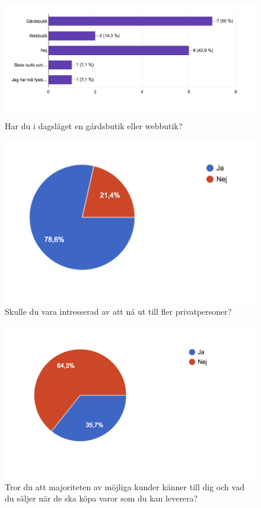 \documentclass[10pt,a4paper,oneside]{article}
\begin{document}
\begin{figure}
	\includegraphics[scale=0.6]{5.png}
	\caption{Har du i dagsl\"aget en g\'ardsbutik eller webbutik?}
\end{figure}

\begin{figure}
	\includegraphics[scale=0.6]{6.png}
	\caption{Skulle du vara intresserad av att n\'a ut till fler privatpersoner?}
\end{figure}

\begin{figure}
	\includegraphics[scale=0.6]{7.png}
	\caption{Tror du att majoriteten av m\"ojliga kunder k\"anner till dig och vad du s\"aljer när de ska k\"opa varor som du kan leverera?}
\end{figure}
\end{document}
